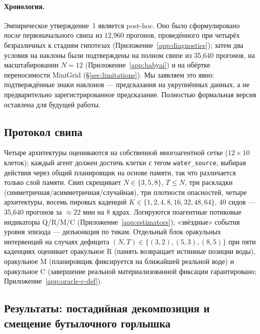 \documentclass{article}
\begin{document}
\paragraph{Хронология.}
Эмпирическое утверждение~1 является post-hoc. Оно было сформулировано \emph{после} первоначального свипа из 12{,}960 прогонов, проведённого при четырёх безразличных к стадиям гипотезах (Приложение~\ref{app:diagnostics}); затем два условия на наклоны были подтверждены на полном свипе из 35{,}640 прогонов, на масштабировании $N\!=\!12$ (Приложение~\ref{app:babyai}) и на обёртке переносимости MiniGrid (\S\ref{sec:limitations}). Мы заявляем это явно: подтверждённые знаки наклонов --- предсказания на укрупнённых данных, а не предварительно зарегистрированное
предсказание. Полностью формальная версия оставлена для будущей работы.

\subsection{Протокол свипа}
\label{sec:multi-agent-protocol}

Четыре архитектуры оцениваются на собственной многоагентной сетке ($12{\times}10$ клеток); каждый агент должен достичь клетки с тегом \texttt{water\_source}, выбирая действия через общий планировщик на основе памяти, так что различается только слой памяти. Свип скрещивает $N{\in}\{3,5,8\}$, $T{\le}N$, три раскладки (симметричная/асимметричная/случайная), три плотности опасностей, четыре архитектуры, восемь пировых каденций $K{\in}\{1,2,4,8,16,32,48,64\}$, 40 сидов --- 35{,}640 прогонов за $\approx 22$ мин на 8 ядрах. Логируются поагентные потиковые индикаторы Q/R/M/C (Приложение~\ref{app:estimators}); «звёздные» события уровня эпизода --- дизъюнкция по тикам. Отдельный блок оракульных интервенций на случаях дефицита $(N,T){\in}\{(3,2),(5,3),(8,5)\}$ при пяти каденциях оценивает оракульное R (память возвращает истинные позиции воды), оракульное M (планировщик фиксируется на ближайшей реальной воде) и оракульное C (завершение реальной материализованной фиксации гарантировано; Приложение~\ref{app:oracle-c-def}).

\subsection{Результаты: постадийная декомпозиция и смещение бутылочного горлышка}
\label{sec:multi-agent-results}
\end{document}
